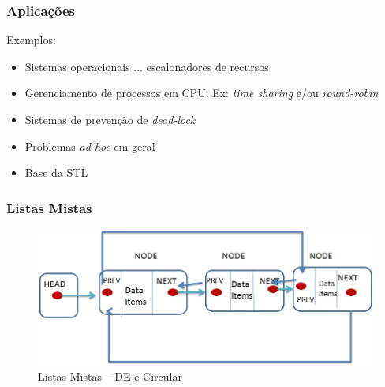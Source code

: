 
\begin{frame}
\frametitle{Aplicações}

\begin{block}{Exemplos:}
\begin{itemize}
  \item Sistemas operacionais ... escalonadores de recursos
  \item Gerenciamento de processos em CPU. Ex: \textit{time sharing} e/ou 
  \textit{round-robin}
  \item Sistemas de prevenção de \textit{dead-lock}
  \item Problemas \textit{ad-hoc} em geral
  \item Base da STL
\end{itemize}
\end{block}

\end{frame} 


\begin{frame}%

\frametitle{Listas Mistas}

\begin{figure}[!hb]
	\centering
	\includegraphics[height=0.450\paperheight, width=0.8\paperwidth]{figs/fig_listas/lista_circular_DE.jpg}						
			\caption{Listas Mistas -- DE e Circular}	
		\end{figure} 

\end{frame} 

